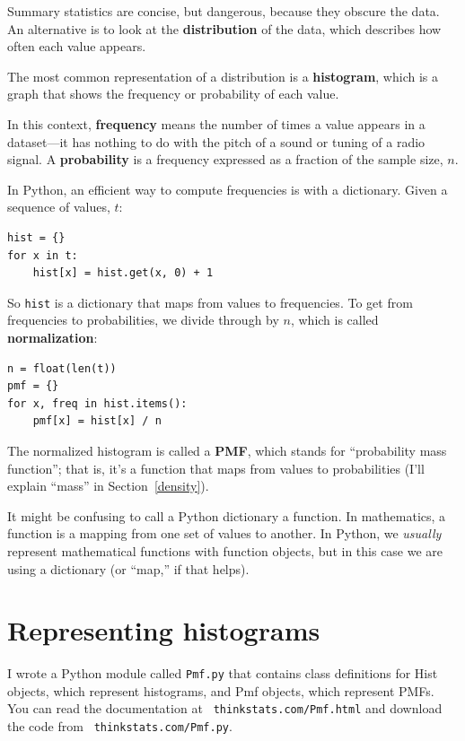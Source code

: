 \documentclass[12pt]{book}
\begin{document}
Summary statistics are concise, but dangerous, because they obscure
the data.  An alternative is to look at the {\bf distribution} of the
data, which describes how often each value appears.

The most common representation of a distribution is a {\bf histogram},
which is a graph that shows the frequency or probability
of each value.  

In this context, {\bf frequency} means the number of times a value
appears in a dataset---it has nothing to do with the pitch of a sound
or tuning of a radio signal.  A {\bf probability} is a frequency expressed
as a fraction of the sample size, $n$.

In Python, an efficient way to compute frequencies is with a dictionary.
Given a sequence of values, $t$:

\begin{verbatim}
hist = {}
for x in t:
    hist[x] = hist.get(x, 0) + 1
\end{verbatim}

So {\tt hist} is a dictionary that maps from values to frequencies.
To get from frequencies to probabilities, we divide through by $n$,
which is called {\bf normalization}:

\begin{verbatim}
n = float(len(t))
pmf = {}
for x, freq in hist.items():
    pmf[x] = hist[x] / n
\end{verbatim}

The normalized histogram is called a {\bf PMF}, which stands for
``probability mass function''; that is, it's a function that maps from
values to probabilities (I'll explain ``mass'' in
Section~\ref{density}).

It might be confusing to call a Python dictionary a function.  In
mathematics, a function is a mapping from one set of values to
another.  In Python, we {\em usually} represent mathematical functions
with function objects, but in this case we are using a dictionary
(or ``map,'' if that helps).

\section{Representing histograms}

I wrote a Python module called {\tt Pmf.py} that contains class
definitions for Hist objects, which represent histograms, and Pmf
objects, which represent PMFs.  You can read the documentation at {\tt
  thinkstats.com/Pmf.html} and download the code from {\tt
  thinkstats.com/Pmf.py}.
\end{document}
